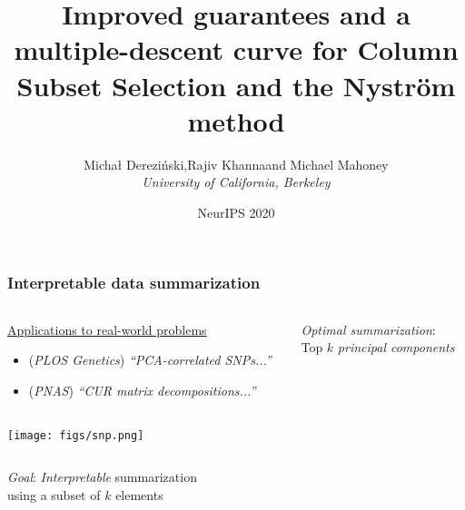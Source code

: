 \documentclass[10pt,handout]{beamer}
\title[]{\large\textrm{Improved guarantees and a multiple-descent curve
for Column Subset Selection and the Nystr\"om method}}
\author[]{Micha{\l} Derezi\'{n}ski,\quad Rajiv Khanna\quad and\quad
  Michael Mahoney\\[2mm]
\small\textit{University of California, Berkeley}}
\date{NeurIPS 2020}
\begin{document}

\linespread{1.3}

\begin{frame}
  \frametitle{Interpretable data summarization}
  \begin{columns}
\begin{column}{.65\textwidth}
  \hspace{3mm}\underline{Applications to real-world problems}
  \begin{itemize}
  \item   \onslide<+->
    {\scriptsize\cite{paschou2007pca} (\textit{PLOS Genetics})
      \textit{``PCA-correlated SNPs...''}} %
\item   \onslide<+-> \cite{mahoney2009cur} (\textit{PNAS})
  {\scriptsize\textit{``CUR matrix decompositions...''}}
  \end{itemize}
\end{column}
\begin{column}{.4\textwidth}
  \vspace{-2mm}
  
  \emph{Optimal summarization}:\\[1mm]
  Top $k$ \textit{principal components}\\
  \\[5mm]
  \onslide<+->
\end{column}
\end{columns}
  \begin{center}
    \texttt{[image: figs/snp.png]}
  \end{center}
  \vspace{3mm}
  
  \begin{columns}
    \begin{column}{0.71\textwidth}
      \onslide<+->
      \emph{Goal}: \textit{Interpretable} summarization\\
      using a subset of $k$ elements
\vspace{3mm}


\end{column}
\end{columns}
\end{frame}
\end{document}
